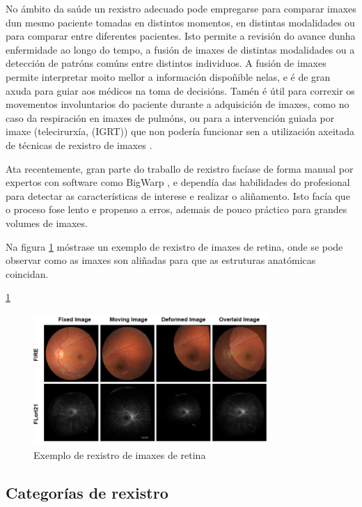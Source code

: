 No ámbito da saúde un rexistro adecuado pode empregarse para comparar imaxes dun mesmo paciente tomadas en distintos momentos, en distintas modalidades ou para comparar entre diferentes pacientes.
Isto permite a revisión do avance dunha enfermidade ao longo do tempo, a fusión de imaxes de distintas modalidades ou a detección de patróns comúns entre distintos individuos.
A fusión de imaxes permite interpretar moito mellor a información dispoñible nelas, e é de gran axuda para guiar aos médicos na toma de decisións.
Tamén é útil para correxir os movementos involuntarios do paciente durante a adquisición de imaxes, como no caso da respiración en imaxes de pulmóns, ou para a intervención guiada por imaxe (telecirurxía, (\gls{IGRT})) que non 
podería funcionar sen a utilización axeitada de técnicas de rexistro de imaxes \cite{wang2022neuralrenderingstereo3d}. 

Ata recentemente, gran parte do traballo de rexistro facíase de forma manual por expertos con software como BigWarp \cite{bigwarp}, 
e dependía das habilidades do profesional para detectar as características de interese e realizar o aliñamento.
Isto facía que o proceso fose lento e propenso a erros, ademais de pouco práctico para grandes volumes de imaxes.

Na figura \ref{fig:retin_reg} móstrase un exemplo de rexistro de imaxes de retina, onde se pode observar como as imaxes son aliñadas para que as estruturas anatómicas coincidan.

\ref{fig:retin_reg}
\begin{figure}[hp!]
    \centering
    \includegraphics[width=0.8\textwidth]{imaxes/retin-reg.png}
    \caption{Exemplo de rexistro de imaxes de retina \cite{sivaraman2024retinaregnetzeroshotapproachretinal}}
    \label{fig:retin_reg}
\end{figure}

\subsection{Categorías de rexistro}
\label{subsec:Categorías de rexistro}

